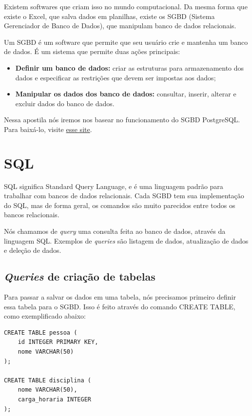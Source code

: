 \documentclass[
	12pt,				%
	openright,			%
	oneside,			%
	a4paper,			%
	english,			%
	french,				%
	spanish,			%
	brazil,				%
	]{abntex2}
\begin{document}
Existem softwares que criam isso no mundo computacional. Da mesma forma que existe o Excel, que salva dados em planilhas, existe os SGBD (Sistema Gerenciador de Banco de Dados), que manipulam banco de dados relacionais.

Um SGBD é um software que permite que seu usuário crie e mantenha um banco de dados. É um sistema que permite duas ações principais: 

 \begin{itemize}
   \item \textbf{Definir um banco de dados:} criar as estruturas para armazenamento dos dados e especificar as restrições que devem ser impostas aos dados;
   \item \textbf{Manipular os dados dos banco de dados:} consultar, inserir, alterar e excluir dados do banco de dados.
 \end{itemize}
 
Nessa apostila nós iremos nos basear no funcionamento do SGBD PostgreSQL. Para baixá-lo, visite \href{https://www.enterprisedb.com/downloads/postgres-postgresql-downloads}{esse site}.

\chapter{SQL}

SQL significa Standard Query Language, e é uma linguagem padrão para trabalhar com bancos de dados relacionais. Cada SGBD tem sua implementação do SQL, mas de forma geral, os comandos são muito parecidos entre todos os bancos relacionais.

Nós chamamos de \textit{query} uma consulta feita ao banco de dados, através da linguagem SQL. Exemplos de \textit{queries} são listagem de dados, atualização de dados e deleção de dados.

\section{\textit{Queries} de criação de tabelas}

Para passar a salvar os dados em uma tabela, nós precisamos primeiro definir essa tabela para o SGBD. Isso é feito através do comando CREATE TABLE, como exemplificado abaixo: 
\begin{verbatim}
CREATE TABLE pessoa (
    id INTEGER PRIMARY KEY,
    nome VARCHAR(50)
);

CREATE TABLE disciplina (
    nome VARCHAR(50),
    carga_horaria INTEGER
);
\end{verbatim}
\end{document}
